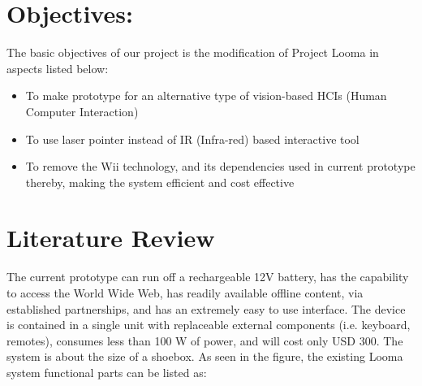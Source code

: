 \documentclass[12pt, a4paper]{article}
\begin{document}
\newpage
\section{Objectives:}

The basic objectives of our project is the modification of Project Looma in aspects listed below:

\begin{itemize}
	\item To make prototype for an alternative type of vision-based HCIs (Human Computer Interaction)
	\item To use laser pointer instead of IR (Infra-red) based interactive tool
	\item To remove the Wii technology, and its dependencies used in current prototype thereby, making the system efficient and cost effective
\end{itemize}


\newpage
\section{Literature Review}
The current prototype can run off a rechargeable 12V battery, has the capability to access the World Wide Web, has readily available offline content, via established partnerships, and has an extremely easy to use interface. The device is contained in a single unit with replaceable external components (i.e. keyboard, remotes), consumes less than 100 W of power, and will cost only USD 300. The system is about the size of a shoebox. 
As seen in the figure, the existing Looma system functional parts can be listed as:
\end{document}

